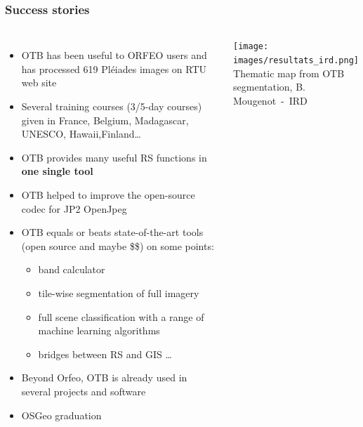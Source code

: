 \documentclass[8pt]{beamer}
\begin{document}
\begin{frame}
  \frametitle{Success stories}
  \vspace{-0.5cm}
\begin{columns}
\begin{itemize}
\item OTB has been useful to ORFEO users and has processed 619 Pléiades
  images on RTU web site
\item Several training courses (3/5-day courses) given in France, Belgium,
Madagascar, UNESCO, Hawaii,Finland\ldots
\item OTB provides many useful RS functions in \textbf{one single tool}
\item OTB helped to improve the open-source codec for JP2 OpenJpeg
\item OTB equals or beats state-of-the-art tools (open source and maybe \$\$) on some points:
  \begin{itemize}
  \item band calculator
  \item tile-wise segmentation of full imagery
  \item full scene classification with a range of machine learning algorithms
  \item bridges between RS and GIS \ldots
  \end{itemize}
\item Beyond Orfeo, OTB is already used in several projects and software
\item OSGeo graduation
\end{itemize}
\texttt{[image: images/resultats\_ird.png]}\\
\tiny{Thematic map from OTB segmentation, B. Mougenot~-~IRD}
\end{columns}
\end{frame}
\end{document}

